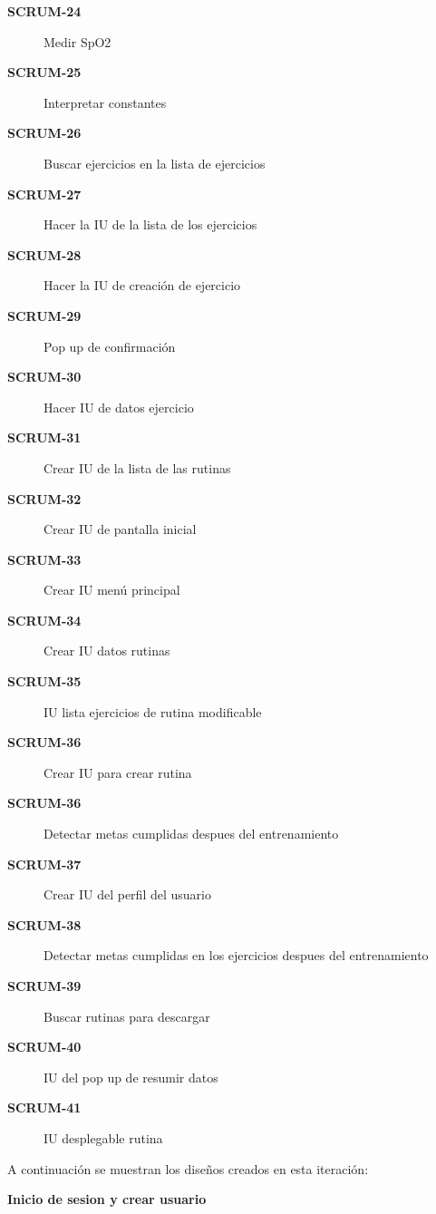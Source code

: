 \begin{description}
  \item[\textbf{SCRUM-24}] Medir SpO2
  \item[\textbf{SCRUM-25}] Interpretar constantes
  \item[\textbf{SCRUM-26}] Buscar ejercicios en la lista de ejercicios
  \item[\textbf{SCRUM-27}] Hacer la IU de la lista de los ejercicios
  \item[\textbf{SCRUM-28}] Hacer la IU de creación de ejercicio
  \item[\textbf{SCRUM-29}] Pop up de confirmación
  \item[\textbf{SCRUM-30}] Hacer IU de datos ejercicio
  \item[\textbf{SCRUM-31}] Crear IU de la lista de las rutinas
  \item[\textbf{SCRUM-32}] Crear IU de pantalla inicial
  \item[\textbf{SCRUM-33}] Crear IU menú principal
  \item[\textbf{SCRUM-34}] Crear IU datos rutinas
  \item[\textbf{SCRUM-35}] IU lista ejercicios de rutina modificable
  \item[\textbf{SCRUM-36}] Crear IU para crear rutina
  \item[\textbf{SCRUM-36}] Detectar metas cumplidas despues del entrenamiento
  \item[\textbf{SCRUM-37}] Crear IU del perfil del usuario
  \item[\textbf{SCRUM-38}] Detectar metas cumplidas en los ejercicios despues del entrenamiento
  \item[\textbf{SCRUM-39}] Buscar rutinas para descargar
  \item[\textbf{SCRUM-40}] IU del pop up de resumir datos
  \item[\textbf{SCRUM-41}] IU desplegable rutina
  
\end{description}

A continuación se muestran los diseños creados en esta iteración:

\textbf{Inicio de sesion y crear usuario}

